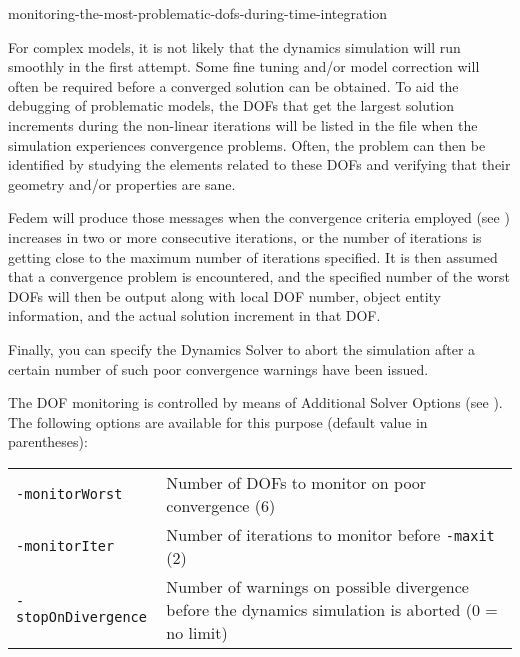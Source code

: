

           {monitoring-the-most-problematic-dofs-during-time-integration}

For complex models, it is not likely that the dynamics simulation will run
smoothly in the first attempt. Some fine tuning and/or model correction will
often be required before a converged solution can be obtained.
To aid the debugging of problematic models, the DOFs that get the largest
solution increments during the non-linear iterations will be listed in the
 file when the simulation experiences convergence problems.
Often, the problem can then be identified by studying the elements related
to these DOFs and verifying that their geometry and/or properties are sane.

Fedem will produce those messages when the convergence criteria employed (see
)
increases in two or more consecutive iterations, or the number of iterations is
getting close to the maximum number of iterations specified.
It is then assumed that a convergence problem is encountered, and the specified
number of the worst DOFs will then be output along with local DOF number,
object entity information, and the actual solution increment in that DOF.

Finally, you can specify the Dynamics Solver to abort the simulation
after a certain number of such poor convergence warnings have been issued.

The DOF monitoring is controlled by means of Additional Solver Options
(see ).
The following options are available for this purpose
(default value in parentheses):

\begin{tabular}{ m{3.0cm} m{8.0cm} }
{\tt-monitorWorst} & Number of DOFs to monitor on poor convergence (6) \\
{\tt-monitorIter} & Number of iterations to monitor before {\tt-maxit} (2) \\
{\tt-stopOnDivergence} & Number of warnings on possible divergence before the
                         dynamics simulation is aborted (0 = no limit)
\end{tabular}


